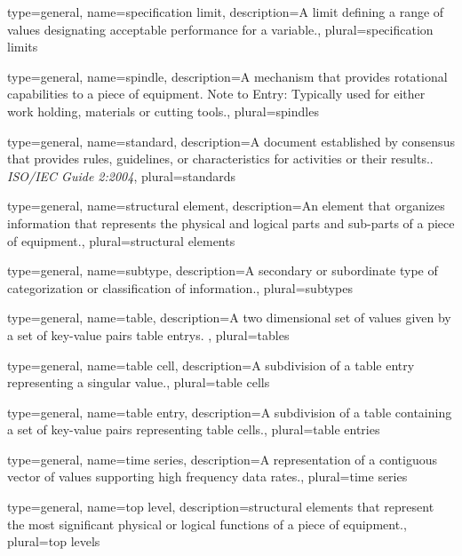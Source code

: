 {
	type={general},
    name={specification limit},
	description={A limit defining a range of values designating acceptable performance for a variable.},
	plural={specification limits}
}

{
	type={general},
    name={spindle},
	description={A mechanism that provides rotational capabilities to a piece of equipment. 
Note to Entry: Typically used for either work holding, materials or cutting tools.},
	plural={spindles}
}

{
	type={general},
    name={standard},
	description={A document established by consensus that provides rules, guidelines, or characteristics for activities or their results.. \textit{ISO/IEC Guide 2:2004}},
	plural={standards}
}

{
	type={general},
    name={structural element},
	description={An \gls{element} that organizes information that represents the physical and logical parts and sub-parts of a piece of equipment.},
	plural={structural elements}
}

{
	type={general},
    name={subtype},
	description={A secondary or subordinate type of categorization or classification of information.},
	plural={subtypes}
}

{
	type={general},
    name={table},
	description={A two dimensional set of values given by a set of \glspl{key-value pair} \glspl{table entry}. },
	plural={tables}
}

{
	type={general},
    name={table cell},
	description={A subdivision of a \gls{table entry} representing a singular value.},
	plural={table cells}
}

{
	type={general},
    name={table entry},
	description={A subdivision of a \gls{table} containing a set of \glspl{key-value pair} representing \glspl{table cell}.},
	plural={table entries}
}

{
	type={general},
    name={time series},
	description={A  representation of a contiguous vector of values supporting high frequency data rates.},
	plural={time series}
}

{
	type={general},
    name={top level},
	description={\glspl{structural element} that represent the most significant physical or logical functions of a piece of equipment.},
	plural={top levels}
}

